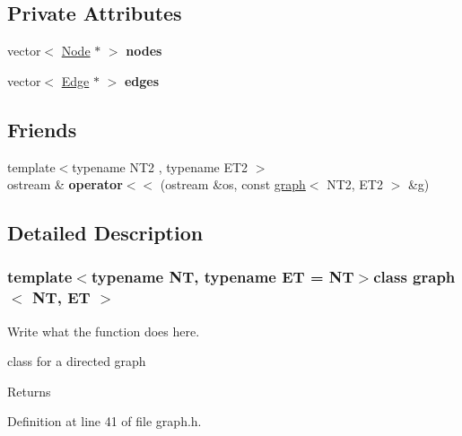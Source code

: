 \subsection*{Private Attributes}
\begin{DoxyCompactItemize}
\item 
\hypertarget{classgraph_ac106879f6e370243b2413de2a0504da4}{vector$<$ \hyperlink{structgraph_1_1Node}{Node} $\ast$ $>$ {\bfseries nodes}}\label{classgraph_ac106879f6e370243b2413de2a0504da4}

\item 
\hypertarget{classgraph_a52ef68305fa541a124199c0e6283b46d}{vector$<$ \hyperlink{structgraph_1_1Edge}{Edge} $\ast$ $>$ {\bfseries edges}}\label{classgraph_a52ef68305fa541a124199c0e6283b46d}

\end{DoxyCompactItemize}
\subsection*{Friends}
\begin{DoxyCompactItemize}
\item 
\hypertarget{classgraph_a3f17ad3ab403d6cde1e4d08908bcdb52}{{\footnotesize template$<$typename N\+T2 , typename E\+T2 $>$ }\\ostream \& {\bfseries operator$<$$<$} (ostream \&os, const \hyperlink{classgraph}{graph}$<$ N\+T2, E\+T2 $>$ \&g)}\label{classgraph_a3f17ad3ab403d6cde1e4d08908bcdb52}

\end{DoxyCompactItemize}


\subsection{Detailed Description}
\subsubsection*{template$<$typename N\+T, typename E\+T = N\+T$>$class graph$<$ N\+T, E\+T $>$}

Write what the function does here. 

class for a directed graph \begin{DoxyReturn}{Returns}

\end{DoxyReturn}


Definition at line 41 of file graph.\+h.



